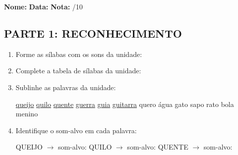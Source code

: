 \begin{exercicio}

\noindent\textbf{Nome:} \underline{\hspace{3.2cm}} \quad \textbf{Data:} \underline{\hspace{1.6cm}} \quad \textbf{Nota:} \underline{\hspace{0.9cm}}/10


\subsection*{PARTE 1: RECONHECIMENTO}

\begin{enumerate}

  \item Forme as sílabas com os sons da unidade:

\begin{center}
\end{center}

  \item Complete a tabela de sílabas da unidade:

\begin{center}
\end{center}

  \item Sublinhe as palavras da unidade:

\begin{center}
  \uline{queijo} \quad \uline{quilo} \quad \uline{quente} \quad \uline{guerra} \quad \uline{guia} \quad \uline{guitarra} \quad quero \quad água \quad gato \quad sapo \quad rato \quad bola \quad menino
\end{center}

  \item Identifique o som-alvo em cada palavra:
  \begin{center}
  QUEIJO $\rightarrow$ som-alvo: \underline{\hspace{1cm}} \quad QUILO $\rightarrow$ som-alvo: \underline{\hspace{1cm}} \quad QUENTE $\rightarrow$ som-alvo: \underline{\hspace{1cm}}
  \end{center}


\end{enumerate}
\end{exercicio}

